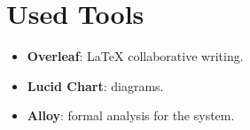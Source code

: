 \section{Used Tools}
\label{sec:used_tools}%

\begin{itemize}
    \item \textbf{Overleaf}: LaTeX collaborative writing.
    \item \textbf{Lucid Chart}: diagrams.
    \item \textbf{Alloy}: formal analysis for the system.
\end{itemize}
